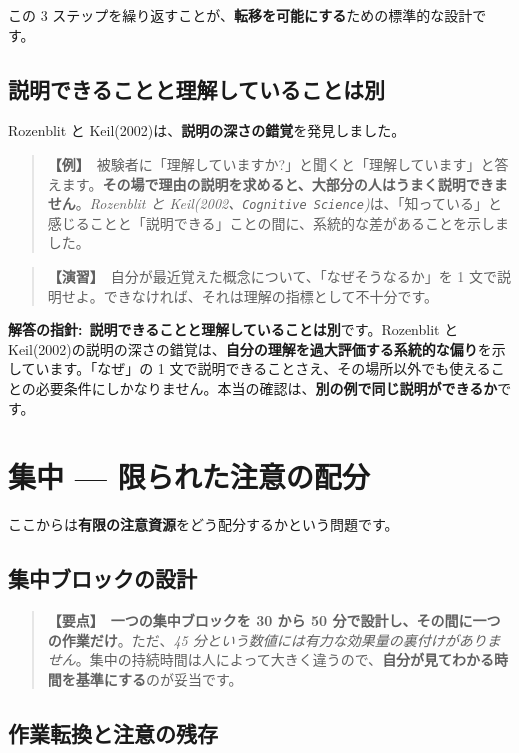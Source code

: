 \documentclass{article}
\begin{document}
この 3 ステップを繰り返すことが、\textbf{転移を可能にする}ための標準的な設計です。

\subsection{説明できることと理解していることは別}

Rozenblit と Keil(2002)は、\textbf{説明の深さの錯覚}を発見しました。

\begin{quote}
\textbf{【例】}\ 被験者に「理解していますか?」と聞くと「理解しています」と答えます。\textbf{その場で理由の説明を求めると、大部分の人はうまく説明できません}。\emph{Rozenblit と Keil(2002、\texttt{Cognitive Science})}は、「知っている」と感じることと「説明できる」ことの間に、系統的な差があることを示しました。
\end{quote}

\begin{quote}
\textbf{【演習】}\ 自分が最近覚えた概念について、「なぜそうなるか」を 1 文で説明せよ。できなければ、それは理解の指標として不十分です。
\end{quote}

\textbf{解答の指針:}\ \textbf{説明できることと理解していることは別}です。Rozenblit と Keil(2002)の説明の深さの錯覚は、\textbf{自分の理解を過大評価する系統的な偏り}を示しています。「なぜ」の 1 文で説明できることさえ、その場所以外でも使えることの必要条件にしかなりません。本当の確認は、\textbf{別の例で同じ説明ができるか}です。

\section{集中 — 限られた注意の配分}

ここからは\textbf{有限の注意資源}をどう配分するかという問題です。

\subsection{集中ブロックの設計}

\begin{quote}
\textbf{【要点】}\ \textbf{一つの集中ブロックを 30 から 50 分で設計し、その間に一つの作業だけ}。ただ、\emph{45 分という数値には有力な効果量の裏付けがありません}。集中の持続時間は人によって大きく違うので、\textbf{自分が見てわかる時間を基準にする}のが妥当です。
\end{quote}

\subsection{作業転換と注意の残存}
\end{document}
